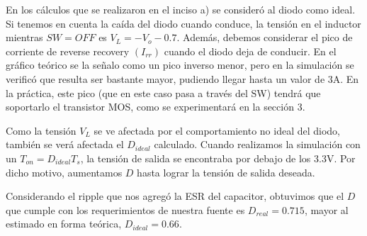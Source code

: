 \documentclass[e4_tp1_main.tex]{subfiles}
\begin{document}
En los c\'alculos que se realizaron en el inciso a) se consider\'o al diodo como ideal. Si tenemos en cuenta la ca\'ida del diodo cuando conduce, la tensi\'on en el inductor mientras $SW=OFF$ es $V_{L}=-V_o-0.7$. Adem\'as, debemos considerar el pico de corriente de reverse recovery $(I_{rr})$ cuando el diodo deja de conducir. En el gráfico teórico se la señalo como un pico inverso menor, pero en la simulación se verificó que resulta ser bastante mayor, pudiendo llegar hasta un valor de 3A. En la práctica, este pico (que en este caso pasa a través del SW) tendrá que soportarlo el transistor MOS, como se experimentará en la sección 3. 



Como la tensi\'on $V_L$ se ve afectada por el comportamiento no ideal del diodo, tambi\'en se ver\'a afectada el $D_{ideal}$ calculado.
Cuando realizamos la simulaci\'on con un $T_{on}=D_{ideal}T_s$, la tensi\'on de salida se encontraba por debajo de los 3.3V. Por dicho motivo, aumentamos $D$ hasta lograr la tensi\'on de salida deseada. 

Considerando el ripple que nos agreg\'o la ESR del capacitor, obtuvimos que el $D$ que cumple con los requerimientos de nuestra fuente es $D_{real}=0.715$, mayor al estimado en forma teórica, $D_{ideal} = 0.66$.








\newpage
\end{document}
